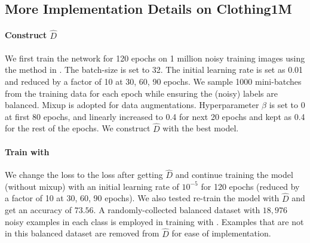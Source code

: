 \documentclass[final]{cvpr}
\newcommand{\estD}{{\hat D}}
\newcommand{\covpeer}{\text{CAL}}
\begin{document}
\subsection{More Implementation Details on Clothing1M}\label{sec:detailImplement}

\paragraph{Construct $\estD$}
We first train the network for 120 epochs on 1 million noisy training images using the method in \cite{sieve2020}.
The batch-size is set to 32. The initial learning rate is set as 0.01 and reduced by a factor of 10 at 30, 60, 90 epochs. 
We sample 1000 mini-batches from the training data for each epoch while ensuring the (noisy) labels are balanced. 
Mixup \cite{zhang2018mixup} is adopted for data augmentations.
Hyperparameter $\beta$ is set to 0 at first 80 epochs, and linearly increased to 0.4 for next 20 epochs and kept as 0.4 for the rest of the epochs. 
We construct $\estD$ with the best model.


\paragraph{Train with \covpeer{}}
We change the loss to the \covpeer{} loss after getting $\estD$ and continue training the model (without mixup) with an initial learning rate of $10^{-5}$ for 120 epochs (reduced by a factor of 10 at 30, 60, 90 epochs).
We also tested re-train the model with $\estD$ and get an accuracy of $73.56$.
A randomly-collected balanced dataset with $18,976$ noisy examples in each class is employed in training with \covpeer{}.
Examples that are not in this balanced dataset are removed from $\estD$ for ease of implementation. 
\end{document}
